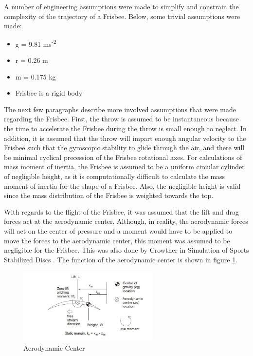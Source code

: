 \documentclass[12pt,twoside,letterpaper]{article}
\begin{document}
\begin{multicols}{2}
A number of engineering assumptions were made to simplify and constrain the complexity of the trajectory of a Frisbee. Below, some trivial assumptions were made: 

\begin{itemize}
    \item g = 9.81 ms\textsuperscript{-2}
    \item r = 0.26 m \cite{DiscCriteria}
    \item m = 0.175 kg \cite{DiscCriteria}
    \item Frisbee is a rigid body
\end{itemize}

The next few paragraphs describe more involved assumptions that were made regarding the Frisbee. First, the throw is assumed to be instantaneous because the time to accelerate the Frisbee during the throw is small enough to neglect. In addition, it is assumed that the throw will impart enough angular velocity to the Frisbee such that the gyroscopic stability to glide through the air, and there will be minimal cyclical precession of the Frisbee rotational axes. For calculations of mass moment of inertia, the Frisbee is assumed to be a uniform circular cylinder of negligible height, as it is computationally difficult to calculate the mass moment of inertia for the shape of a Frisbee. Also, the negligible height is valid since the mass distribution of the Frisbee is weighted towards the top. \par

With regards to the flight of the Frisbee, it was assumed that the lift and drag forces act at the aerodynamic center. Although, in reality, the aerodynamic forces will act on the center of pressure and a moment would have to be applied to move the forces to the aerodynamic center, this moment was assumed to be negligible for the Frisbee. This was also done by Crowther in Simulation of Sports Stabilized Discs \cite{Crowther2007}. The function of the aerodynamic center is shown in figure \ref{ac_center}.

\begin{figure}[H]
\centering
\includegraphics[width=7cm]{figures/acDiagram.png}
\caption{Aerodynamic Center}
\label{ac_center}
\end{figure}


\end{multicols}
\end{document}
